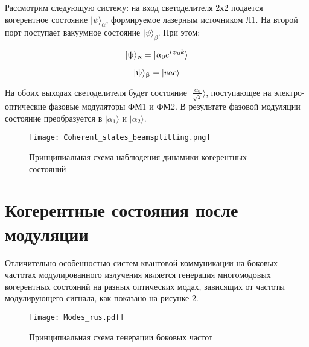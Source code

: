 Рассмотрим следующую систему: на вход светоделителя 2х2 подается когерентное состояние $| \psi \rangle_{\alpha}$, формируемое лазерным источником Л1. На второй порт поступает вакуумное состояние $| \psi \rangle_{\beta}$. При этом:

\begin{equation}
	| \psi \rangle_{\alpha} = | \alpha_{0} e^{i\phi_{0}k} \rangle \\
\end{equation}

\begin{equation}
	| \psi \rangle_{\beta} = | vac \rangle \\
\end{equation}


На обоих выходах светоделителя будет состояние  $| \frac{\alpha_{0}}{\sqrt{2}} \rangle$, поступающее на электро-оптические фазовые модуляторы ФМ1 и ФМ2. В результате фазовой модуляции состояние преобразуется в $| \alpha_{1} \rangle$ и $| \alpha_{2} \rangle$. 


 \begin{figure}[ht]
  \centering
  \texttt{[image: Coherent\_states\_beamsplitting.png]}
  \caption{Принципиальная схема наблюдения динамики когерентных состояний}
  \label{fig:Coherent_states_beamsplitting}
\end{figure}

\pagebreak

\section{Когерентные состояния после модуляции} \label{ch:ch4/sec3}

Отличительно особенностью систем квантовой коммуникации на боковых частотах модулированного излучения является генерация многомодовых когерентных состояний на разных оптических модах, зависящих от частоты модулирующего сигнала, как показано на рисунке \ref{fig:multimodes}. 

 \begin{figure}[ht]
  \centering
  \texttt{[image: Modes\_rus.pdf]}
  \caption{Принципиальная схема генерации боковых частот}
  \label{fig:multimodes}
\end{figure}


